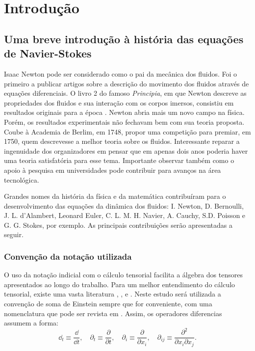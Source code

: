 \chapter[Introdução]{Introdução}

\section{Uma breve introdução à história das equações de Navier-Stokes }

Isaac Newton pode ser considerado como o pai da mecânica dos fluidos. Foi o primeiro a publicar artigos sobre a descrição do movimento dos fluidos através de equações diferenciais. O livro 2 do famoso \emph{Principia}, em que Newton descreve as propriedades dos fluidos e sua interação com os corpos imersos, consistiu em resultados originais para a época \cite{truesdell1953notes}. Newton abria mais um novo campo na física. Porém, os resultados experimentais não fechavam bem com sua teoria proposta. Coube à Academia de Berlim, em 1748, propor uma competição para premiar, em 1750, quem descrevesse a melhor teoria sobre os fluidos. Interessante reparar a ingenuidade dos organizadores em pensar que em apenas dois anos poderia haver uma teoria satisfatória para esse tema. Importante observar também como o apoio à pesquisa em universidades pode contribuir para avanços na área tecnológica.

Grandes nomes da história da física e da matemática contribuíram para o desenvolvimento das equações da dinâmica dos fluidos: I. Newton, D. Bernoulli, J. L. d'Alambert, Leonard Euler, C. L. M. H. Navier, A. Cauchy, S.D. Poisson e G. G. Stokes, por exemplo. As principais contribuições serão apresentadas a seguir.
\subsection{Convenção da notação utilizada}
O uso da notação indicial com o cálculo tensorial facilita a álgebra dos tensores apresentados ao longo do trabalho. Para um melhor entendimento do cálculo tensorial, existe uma vasta literatura \cite{aris2012vectors}, \cite{jeffreys1961cartesian}, \cite{arfken1999mathematical} e \cite{morse1953mathematical}. Neste estudo será utilizada a convenção de soma de Einstein sempre que for conveniente, com uma nomenclatura que pode ser revista em \cite{frisch1995turbulence}. Assim, os operadores diferencias assumem a forma:
\begin{equation}
\dd_{t} \equiv \frac{\dd}{\dd t}, \quad
    \partial_{t} \equiv \frac{\partial}{\partial t}, \quad \partial_{i} \equiv \frac{\partial}{\partial x_{i}}, \quad \partial_{ij} \equiv \frac{\partial^2}{\partial x_{i}\partial x_{j}}.  
\end{equation}


